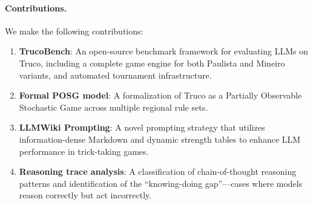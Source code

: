 \paragraph{Contributions.} We make the following contributions:
\begin{enumerate}
    \item \textbf{TrucoBench}: An open-source benchmark framework for evaluating LLMs on Truco, including a complete game engine for both Paulista and Mineiro variants, and automated tournament infrastructure.
    \item \textbf{Formal POSG model}: A formalization of Truco as a Partially Observable Stochastic Game across multiple regional rule sets.
    \item \textbf{LLMWiki Prompting}: A novel prompting strategy that utilizes information-dense Markdown and dynamic strength tables to enhance LLM performance in trick-taking games.
    \item \textbf{Reasoning trace analysis}: A classification of chain-of-thought reasoning patterns and identification of the ``knowing-doing gap''---cases where models reason correctly but act incorrectly.
\end{enumerate}
